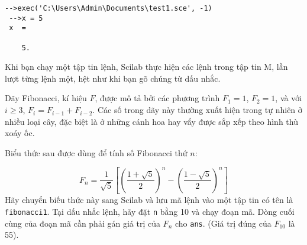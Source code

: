 \documentclass[12pt]{book}
\begin{document}
\begin{verbatim}
-->exec('C:\Users\Admin\Documents\test1.sce', -1)
 -->x = 5
 x  =
 
    5. 
\end{verbatim}
%
Khi bạn chạy một tập tin lệnh, Scilab thực hiện các lệnh trong tập
tin M, lần lượt từng lệnh một, hệt như khi bạn gõ chúng từ dấu nhắc.

%
%

%
%
%

\begin{ex}
Dãy Fibonacci, kí hiệu $F$, được mô tả bởi các phương trình 
$F_1 = 1$, $F_2 = 1$, và với $i \ge 3$, $F_{i} = F_{i-1} + F_{i-2}$.
Các số trong dãy này thường xuất hiện trong tự nhiên ở nhiều loại cây,
đặc biệt là ở những cánh hoa hay vẩy được sắp xếp theo hình thù
xoáy ốc.

Biểu thức sau được dùng để tính số Fibonacci thứ $n$:

\begin{equation}
F_n = \frac{1}{\sqrt{5}}
\left[ 
\left( \frac{1 + \sqrt{5}}{2} \right)^{n} -
\left( \frac{1 - \sqrt{5}}{2} \right)^{n}
\right]
\end{equation}
%
Hãy chuyển biếu thức này sang Scilab và lưu mã lệnh vào
một tập tin có tên là {\tt fibonacci1}.  Tại dấu nhắc lệnh, hãy
đặt {\tt n} bằng 10 và chạy đoạn mã. Dòng cuối cùng của đoạn mã
cần phải gán giá trị của $F_n$ cho {\tt ans}.
(Giá trị đúng của $F_{10}$ là 55).
\end{ex}
\end{document}
